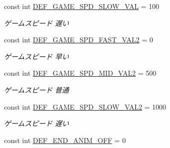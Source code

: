 \begin{DoxyCompactItemize}
\mbox{\label{class_reversi_wpf_1_1_reversi_const_aea725da66cb6c5f5d95d3329586be5f0}} 
const int \hyperlink{class_reversi_wpf_1_1_reversi_const_aea725da66cb6c5f5d95d3329586be5f0}{D\+E\+F\+\_\+\+G\+A\+M\+E\+\_\+\+S\+P\+D\+\_\+\+S\+L\+O\+W\+\_\+\+V\+AL} = 100
\begin{DoxyCompactList}\small\item\em ゲームスピード 遅い \end{DoxyCompactList}\item 
\mbox{\label{class_reversi_wpf_1_1_reversi_const_aa141d143c9f62a286018f740a19c3b58}} 
const int \hyperlink{class_reversi_wpf_1_1_reversi_const_aa141d143c9f62a286018f740a19c3b58}{D\+E\+F\+\_\+\+G\+A\+M\+E\+\_\+\+S\+P\+D\+\_\+\+F\+A\+S\+T\+\_\+\+V\+A\+L2} = 0
\begin{DoxyCompactList}\small\item\em ゲームスピード 早い \end{DoxyCompactList}\item 
\mbox{\label{class_reversi_wpf_1_1_reversi_const_a83bd3f7ec5a5dd0ac38551e786de9b63}} 
const int \hyperlink{class_reversi_wpf_1_1_reversi_const_a83bd3f7ec5a5dd0ac38551e786de9b63}{D\+E\+F\+\_\+\+G\+A\+M\+E\+\_\+\+S\+P\+D\+\_\+\+M\+I\+D\+\_\+\+V\+A\+L2} = 500
\begin{DoxyCompactList}\small\item\em ゲームスピード 普通 \end{DoxyCompactList}\item 
\mbox{\label{class_reversi_wpf_1_1_reversi_const_a90b01446d5a70b64c3cd6e7a1f4383e6}} 
const int \hyperlink{class_reversi_wpf_1_1_reversi_const_a90b01446d5a70b64c3cd6e7a1f4383e6}{D\+E\+F\+\_\+\+G\+A\+M\+E\+\_\+\+S\+P\+D\+\_\+\+S\+L\+O\+W\+\_\+\+V\+A\+L2} = 1000
\begin{DoxyCompactList}\small\item\em ゲームスピード 遅い \end{DoxyCompactList}\item 
\mbox{\label{class_reversi_wpf_1_1_reversi_const_a4e4dce3dd500d0e25716488c4226c620}} 
const int \hyperlink{class_reversi_wpf_1_1_reversi_const_a4e4dce3dd500d0e25716488c4226c620}{D\+E\+F\+\_\+\+E\+N\+D\+\_\+\+A\+N\+I\+M\+\_\+\+O\+FF} = 0

\end{DoxyCompactItemize}
